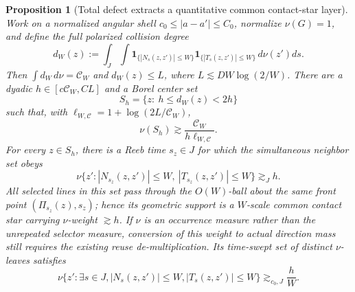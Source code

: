 \documentclass[10pt]{article}
\newtheorem{proposition}[theorem]{Proposition}
\begin{document}
\begin{proposition}[Total defect extracts a quantitative common contact-star layer]
\label{prop:v057-total-defect-contact-star}
Work on a normalized angular shell
\(c_0\le|a-a'|\le C_0\), normalize \(\nu(G)=1\), and define the full polarized collision degree
\begin{equation}
\label{eq:v057-full-collision-degree}
d_W(z)
:=
\int_J\int
\mathbf 1_{\{|N_s(z,z')|\le W\}}
\mathbf 1_{\{|T_s(z,z')|\le W\}}
\,d\nu(z')ds.
\end{equation}
Then \(\int d_W\,d\nu=\mathcal C_W\) and
\(d_W(z)\le L\), where \(L\lesssim DW\log(2/W)\).  There are a dyadic
\(h\in[c\mathcal C_W,CL]\) and a Borel center set
\[
S_h=\{z:\ h\le d_W(z)<2h\}
\]
such that, with \(\ell_{W,\mathcal C}=1+\log(2L/\mathcal C_W)\),
\begin{equation}
\label{eq:v057-contact-star-center-mass}
\boxed{
\nu(S_h)
\gtrsim
\frac{\mathcal C_W}{h\ell_{W,\mathcal C}}.
}
\end{equation}
For every \(z\in S_h\), there is a Reeb time \(s_z\in J\) for which the simultaneous neighbor
set obeys
\begin{equation}
\label{eq:v057-simultaneous-contact-star}
\boxed{
\nu\{z':|N_{s_z}(z,z')|\le W,\ |T_{s_z}(z,z')|\le W\}
\gtrsim_J h.
}
\end{equation}
All selected lines in this set pass through the \(O(W)\)-ball about the same front point
\((\Pi_{s_z}(z),s_z)\); hence its geometric support is a \(W\)-scale common contact star carrying
\(\nu\)-weight \(\gtrsim h\).  If \(\nu\) is an occurrence measure rather than the unrepeated
selector measure, conversion of this weight to actual direction mass still requires the existing
reuse de-multiplication.  Its time-swept set of distinct \(\nu\)-leaves satisfies
\begin{equation}
\label{eq:v057-swept-contact-star-leaves}
\boxed{
\nu\{z':\exists s\in J, |N_s(z,z')|\le W, |T_s(z,z')|\le W\}
\gtrsim_{c_0,J}
\frac{h}{W}.
}
\end{equation}


\end{proposition}
\end{document}
